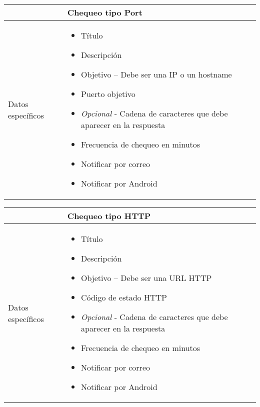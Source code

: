 \begin{center}
  
  \begin{tabularx}{\textwidth}{|l|X|}
    \hline

    & Chequeo tipo Port \\

    \hline
    Datos específicos &

    \begin{itemize}
      \item Título 
      \item Descripción
      \item Objetivo -- Debe ser una IP o un hostname
      \item Puerto objetivo
      \item \textit{Opcional} - Cadena de caracteres que debe aparecer en la respuesta
      \item Frecuencia de chequeo en minutos
      \item Notificar por correo
      \item Notificar por Android
    \end{itemize}
    \\
    
    \hline
    
  \end{tabularx}
\end{center}

\begin{center}
  
  \begin{tabularx}{\textwidth}{|l|X|}
    \hline

    & Chequeo tipo HTTP \\

    \hline
    Datos específicos &

    \begin{itemize}
      \item Título 
      \item Descripción
      \item Objetivo -- Debe ser una \ac{URL} \ac{HTTP}
      \item Código de estado HTTP
      \item \textit{Opcional} - Cadena de caracteres que debe aparecer en la respuesta
      \item Frecuencia de chequeo en minutos
      \item Notificar por correo
      \item Notificar por Android
    \end{itemize}
    \\
    
    \hline
    
  \end{tabularx}
\end{center}

